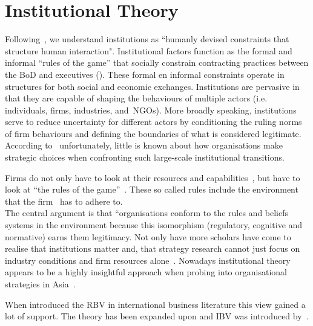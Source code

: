 \section{Institutional Theory}


Following~\cite{North:1990}, we understand institutions as ``humanly devised constraints that structure human interaction". 
Institutional factors function as the formal and informal ``rules of the game'' that socially constrain contracting practices between the \gls{BoD} and executives (\cite{North:1990}).  %
These formal en informal constraints operate in structures for both social and economic exchanges. 
Institutions are pervasive in that they are capable of shaping the behaviours of multiple actors (i.e. 
individuals, firms, industries, and~\glspl{NGO}). 
More broadly speaking, institutions serve to reduce uncertainty for different actors by conditioning the ruling norms of firm behaviours and defining the boundaries of what is considered legitimate.~\cite{Peng:2008}\\


According to~\cite{Peng:2003} unfortunately, little is known about how organisations make strategic choices when confronting such large-scale institutional transitions.


 Firms do not only have to look at their resources and capabilities~\cite{Barney:1991}, but have to look at ``the rules of the game''~\cite{Scott:1995}. These so called rules include the environment that the firm \mne~has to adhere to.\\

The central argument is that “organisations conform to the rules and beliefs systems in the environment because this isomorphism (regulatory, cognitive and normative) earns them legitimacy.
Not only have more scholars have come to realise that institutions matter and, that strategy research cannot just focus on industry conditions and firm resources alone~\cite{Powell:1991,Scott:1995}.
Nowadays institutional theory appears to be a highly insightful approach when probing into organisational strategies in Asia~\cite{Hoskisson:2000}.

When introduced the \gls{RBV} in international business literature this view gained a lot of support. 
The theory has been expanded upon and \gls{IBV} was introduced by~\cite{Kostova:1999,Meyer:2009,Wang:2012}.




